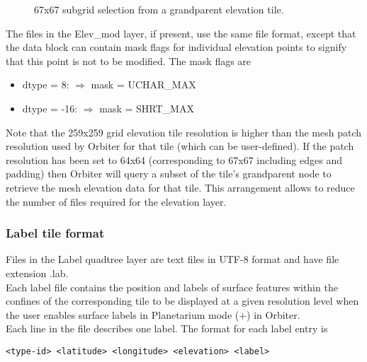 \documentclass[Orbiter Developer Manual.tex]{subfiles}
\begin{document}
\begin{figure}[H]
	\centering
	\caption{67x67 subgrid selection from a grandparent elevation tile.}
\end{figure}

\noindent
The files in the Elev\_mod layer, if present, use the same file format, except that the data block can contain mask flags for individual elevation points to signify that this point is not to be modified. The mask flags are

\begin{itemize}
\item dtype = 8: $\Rightarrow$ mask = UCHAR\_MAX
\item dtype = -16: $\Rightarrow$ mask = SHRT\_MAX
\end{itemize}

\noindent
Note that the 259x259 grid elevation tile resolution is higher than the mesh patch resolution used by Orbiter for that tile (which can be user-defined). If the patch resolution has been set to 64x64 (corresponding to 67x67 including edges and padding) then Orbiter will query a subset of the tile's grandparent node to retrieve the mesh elevation data for that tile. This arrangement allows to reduce the number of files required for the elevation layer.


\subsubsection{Label tile format}
\label{sssec:label_tile_format}
Files in the Label quadtree layer are text files in UTF-8 format and have file extension .lab.\\
Each label file contains the position and labels of surface features within the confines of the corresponding tile to be displayed at a given resolution level when the user enables surface labels in Planetarium mode (\Ctrl+) in Orbiter.\\
Each line in the file describes one label. The format for each label entry is

\begin{lstlisting}[language=OSFS]
<type-id> <latitude> <longitude> <elevation> <label>
\end{lstlisting}
\end{document}
